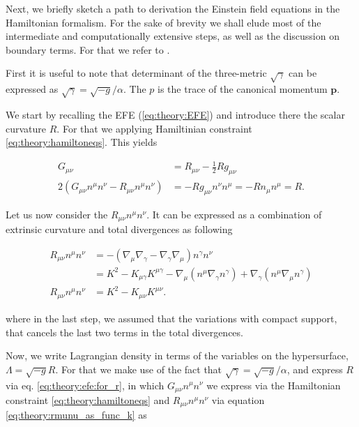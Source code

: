 \documentclass[11pt,a4paper,headinclude=true,DIV=14,BCOR=8mm,chapterprefix,listof=totoc,twoside,openright,abstracton]{scrbook}
\begin{document}

Next, we briefly sketch a path to derivation the Einstein field equations in the Hamiltonian formalism. For the sake of brevity we shall elude most of the intermediate and computationally extensive steps, as well as the discussion on boundary terms. For that we refer to \cite{Poisson:2004}.

First it is useful to note that determinant of the three-metric $\sqrt{\gamma}$ can be expressed as $\sqrt{\gamma}=\sqrt{-g}/\alpha$. The $p$ is the trace of the canonical momentum $\boldsymbol{p}$.

We start by recalling the EFE (\ref{eq:theory:EFE}) and introduce there the scalar curvature $R$. For that we applying Hamiltinian constraint \ref{eq:theory:hamiltoneqs}. This yields

\begin{align}
G_{\mu\nu} &= R_{\mu\nu} - \frac{1}{2}Rg_{\mu\nu} \\
2(G_{\mu\nu}n^{\mu}n^{\nu} - R_{\mu\nu}n^{\mu}n^{\nu}) &= -Rg_{\mu\nu}n^{\nu}n^{\mu} = -Rn_{\mu}n^{\mu} =  
R.
\label{eq:theory:efe:for_r}
\end{align}

Let us now consider the $R_{\mu\nu}n^{\mu}n^{\nu}$. It can be expressed as a combination of extrinsic curvature and total divergences as following

\begin{align}
R_{\mu\nu}n^{\mu}n^{\nu} &= -(\nabla_{\mu}\nabla_{\gamma} - \nabla_{\gamma}\nabla_{\mu})n^{\gamma}n^{\nu} \\
&= K^2 - K_{\mu\gamma}K^{\mu\gamma} - \nabla_{\mu}(n^{\mu}\nabla_{\gamma}n^{\gamma}) + \nabla_{\gamma}(n^{\mu}\nabla_{\mu}n^{\gamma}) \\
R_{\mu\nu}n^{\mu}n^{\nu} &= K^2 - K_{\mu\nu}K^{\mu\nu}.
\label{eq:theory:rmunu_as_func_k}
\end{align}

where in the last step, we assumed that the variations with compact support, that cancels the last two terms in the total divergences. 

Now, we write Lagrangian density in terms of the variables on the hypersurface, $\Lambda = \sqrt{-g}R $. For that we make use of the fact that  $\sqrt{\gamma}=\sqrt{-g}/\alpha$, and express $R$ via eq. \ref{eq:theory:efe:for_r}, in which $G_{\mu\nu}n^{\mu}n^{\nu}$ we express via the Hamiltonian constraint \ref{eq:theory:hamiltoneqs} and $R_{\mu\nu}n^{\mu}n^{\nu}$ via equation \ref{eq:theory:rmunu_as_func_k} as
\end{document}
